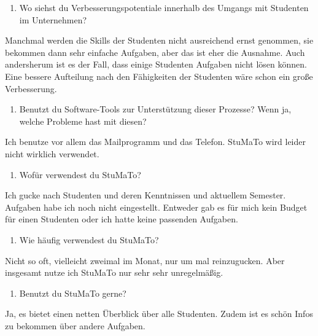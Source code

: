 \documentclass[
  12pt,
  ngerman,
  a4paper,
]{article}
\providecommand{\tightlist}{%
  \setlength{\itemsep}{0pt}\setlength{\parskip}{0pt}}
\begin{document}
\begin{enumerate}
\def\labelenumi{\arabic{enumi}.}
\setcounter{enumi}{7}
\tightlist
\item
  Wo siehst du Verbesserungspotentiale innerhalb des Umgangs mit
  Studenten im Unternehmen?
\end{enumerate}

Manchmal werden die Skills der Studenten nicht ausreichend ernst
genommen, sie bekommen dann sehr einfache Aufgaben, aber das ist eher
die Ausnahme. Auch andersherum ist es der Fall, dass einige Studenten
Aufgaben nicht lösen können. Eine bessere Aufteilung nach den
Fähigkeiten der Studenten wäre schon ein große Verbesserung.

\begin{enumerate}
\def\labelenumi{\arabic{enumi}.}
\setcounter{enumi}{8}
\tightlist
\item
  Benutzt du Software-Tools zur Unterstützung dieser Prozesse? Wenn ja,
  welche Probleme hast mit diesen?
\end{enumerate}

Ich benutze vor allem das Mailprogramm und das Telefon. StuMaTo wird
leider nicht wirklich verwendet.

\begin{enumerate}
\def\labelenumi{\arabic{enumi}.}
\setcounter{enumi}{9}
\tightlist
\item
  Wofür verwendest du StuMaTo?
\end{enumerate}

Ich gucke nach Studenten und deren Kenntnissen und aktuellem Semester.
Aufgaben habe ich noch nicht eingestellt. Entweder gab es für mich kein
Budget für einen Studenten oder ich hatte keine passenden Aufgaben.

\begin{enumerate}
\def\labelenumi{\arabic{enumi}.}
\setcounter{enumi}{10}
\tightlist
\item
  Wie häufig verwendest du StuMaTo?
\end{enumerate}

Nicht so oft, vielleicht zweimal im Monat, nur um mal reinzugucken. Aber
insgesamt nutze ich StuMaTo nur sehr sehr unregelmäßig.

\begin{enumerate}
\def\labelenumi{\arabic{enumi}.}
\setcounter{enumi}{11}
\tightlist
\item
  Benutzt du StuMaTo gerne?
\end{enumerate}

Ja, es bietet einen netten Überblick über alle Studenten. Zudem ist es
schön Infos zu bekommen über andere Aufgaben.
\end{document}
